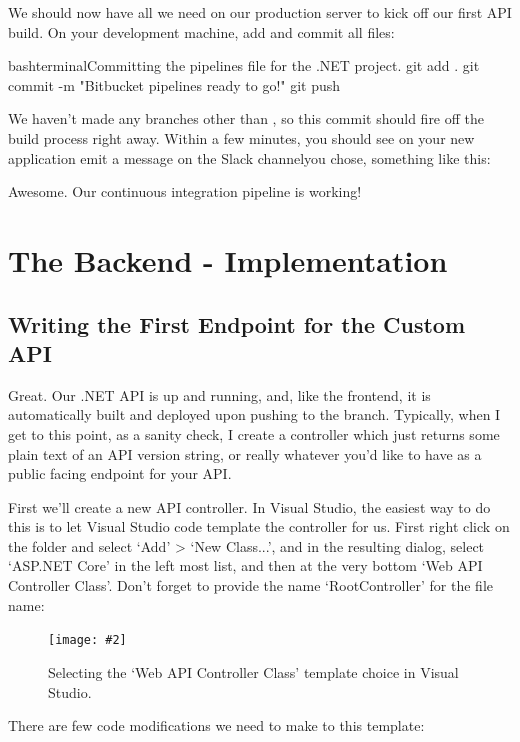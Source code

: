 \documentclass[paper=6in:9in,pagesize=pdftex,headinclude=on,footinclude=on,12pt,twoside]{scrbook}
\newcommand{\standardfigure}[3]{\begin{figure}[H]\begin{center}\texttt{[image: \#2]}\caption{#3}\label{fig:#2}\end{center}\end{figure}}
\begin{document}
We should now have all we need on our production server to kick off our first API build. On your development machine, add and commit all files:

\begin{codeInput}{bash}{terminal}{Committing the pipelines file for the .NET project.}
git add .
git commit -m "Bitbucket pipelines ready to go!"
git push
\end{codeInput}

We haven't made any branches other than , so this commit should fire off the build process right away. Within a few minutes, you should see on your new application emit a message on the Slack channelyou chose, something like this:



Awesome. Our continuous integration pipeline is working!

\chapter{The Backend - Implementation}

\section{Writing the First Endpoint for the Custom API}

Great. Our .NET API is up and running, and, like the frontend, it is automatically built and deployed upon pushing to the  branch. Typically, when I get to this point, as a sanity check, I create a  controller which just returns some plain text of an API version string, or really whatever you'd like to have as a public facing endpoint for your API.


First we'll create a new API controller. In Visual Studio, the easiest way to do this is to let Visual Studio code template the controller for us. First right click on the  folder and select `Add' > `New Class...', and in the resulting dialog, select `ASP.NET Core' in the left most list, and then at the very bottom `Web API Controller Class'. Don't forget to provide the name `RootController' for the file name:

\standardfigure{\textwidth}{backend/web-api-controller}{Selecting the `Web API Controller Class' template choice in Visual Studio.}

There are few code modifications we need to make to this template: 
\end{document}
